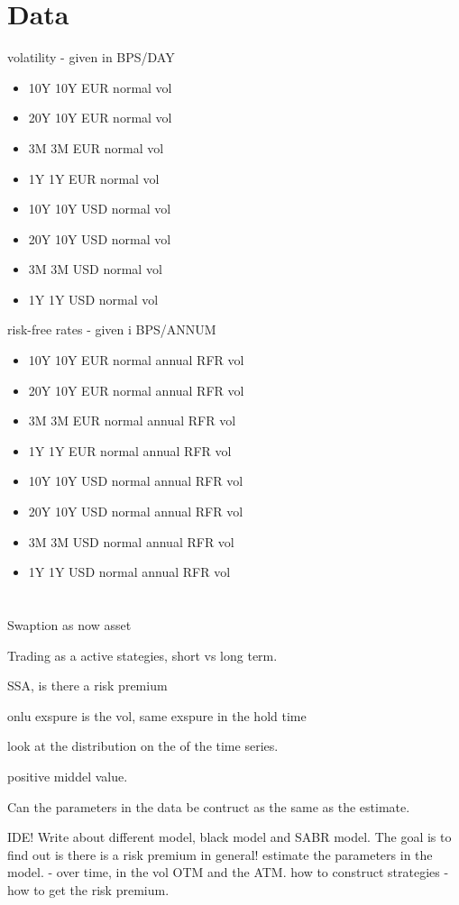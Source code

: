 \documentclass{article}
\begin{document}
\section{Data}
volatility  - given in BPS/DAY
\begin{itemize}
  \item 10Y 10Y EUR normal vol 
  \item 20Y 10Y EUR normal vol 
  \item 3M 3M EUR normal vol
  \item 1Y 1Y EUR normal vol 
  \item 10Y 10Y USD normal vol 
  \item 20Y 10Y USD normal vol 
  \item 3M 3M USD normal vol
  \item 1Y 1Y USD normal vol 
\end{itemize}
risk-free rates - given i BPS/ANNUM
\begin{itemize}
  \item 10Y 10Y EUR normal annual RFR vol 
  \item 20Y 10Y EUR normal annual RFR vol  
  \item 3M 3M EUR normal annual RFR vol 
  \item 1Y 1Y EUR normal annual RFR vol  
  \item 10Y 10Y USD normal annual RFR vol  
  \item 20Y 10Y USD normal annual RFR vol  
  \item 3M 3M USD normal annual RFR vol 
  \item 1Y 1Y USD normal annual RFR vol  
\end{itemize}


\section{}

Swaption as now asset

Trading as a active stategies, short vs long term. 

SSA, is there a risk premium

onlu exspure is the vol, same exspure in the hold time

look at the distribution on the of the time series. 

positive middel value. 

Can the parameters in the data be contruct as the same as the estimate. 


IDE! 
Write about different model, black model and SABR model. 
The goal is to find out is there is a risk premium in general!
estimate the parameters in the model. 
- over time, in the vol OTM and the ATM. 
how to construct strategies
-how to get the risk premium.
\end{document}
